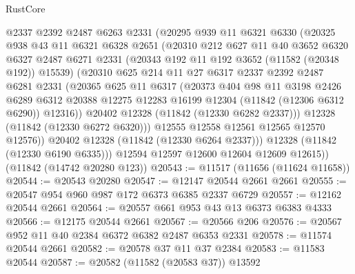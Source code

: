 \begin{lexlean}{RustCore}
\begin{coremodule}
            @2337
            @2392
            @2487
            @6263
            @2331
            (@20295
              @939
              @11
              @6321
              @6330
              (@20325
                @938
                @43
                @11
                @6321
                @6328
                @2651
                (@20310
                  @212
                  @627
                  @11
                  @40
                  @3652
                  @6320
                  @6327
                  @2487
                  @6271
                  @2331
                  (@20343 @192 @11 @192 @3652 (@11582 (@20348 @192)) @15539)
                  (@20310
                    @625
                    @214
                    @11
                    @27
                    @6317
                    @2337
                    @2392
                    @2487
                    @6281
                    @2331
                    (@20365
                      @625
                      @11
                      @6317
                      (@20373
                        @404
                        @98
                        @11
                        @3198
                        @2426
                        @6289
                        @6312
                        @20388
                        @12275
                        @12283
                        @16199
                        @12304
                        (@11842 (@12306 @6312 @6290))
                        @12316))
                    @20402
                    @12328
                    (@11842 (@12330 @6282 @2337)))
                  @12328
                  (@11842 (@12330 @6272 @6320)))
                @12555
                @12558
                @12561
                @12565
                @12570
                @12576))
            @20402
            @12328
            (@11842 (@12330 @6264 @2337)))
          @12328
          (@11842 (@12330 @6190 @6335)))
        @12594
        @12597
        @12600
        @12604
        @12609
        @12615))
    (@11842 (@14742 @20280 @123))
@20543 := @11517 (@11656 (@11624 @11658))
@20544 := @20543 @20280
@20547 := @12147 @20544 @2661 @2661
@20555 := @20547 @954 @960 @987 @172 @6373 @6385 @2337 @6729
@20557 := @12162 @20544 @2661
@20564 := @20557 @661 @953 @43 @13 @6373 @6383 @4333
@20566 := @12175 @20544 @2661
@20567 := @20566 @206
@20576 := @20567 @952 @11 @40 @2384 @6372 @6382 @2487 @6353 @2331
@20578 := @11574 @20544 @2661
@20582 := @20578 @37 @11 @37 @2384
@20583 := @11583 @20544
@20587 := @20582 (@11582 (@20583 @37)) @13592

\end{coremodule}
\end{lexlean}
